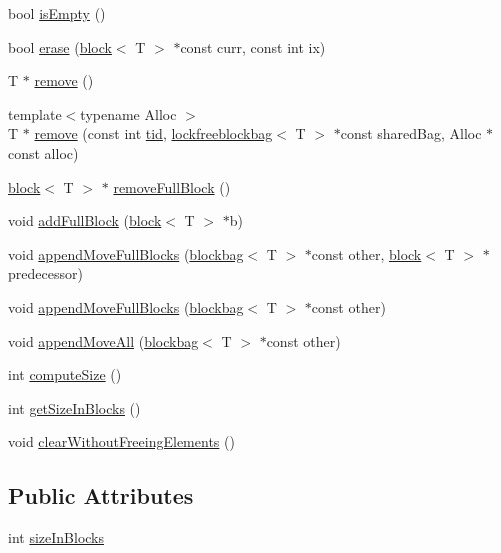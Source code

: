 \begin{DoxyCompactItemize}
bool \hyperlink{classblockbag_a376e7a8a4f8a2a4d0670504b4e8de0ba}{is\+Empty} ()
\item 
bool \hyperlink{classblockbag_ac9ef89b54e16c01853e9ba7fcc3eaad5}{erase} (\hyperlink{classblock}{block}$<$ T $>$ $\ast$const curr, const int ix)
\item 
T $\ast$ \hyperlink{classblockbag_a673f44a045b3b89c1ce9360d20e6037a}{remove} ()
\item 
{\footnotesize template$<$typename Alloc $>$ }\\T $\ast$ \hyperlink{classblockbag_a3d7ed27113ec3ff8239ff7739664dd0b}{remove} (const int \hyperlink{microbench_2main_8cpp_a9ca9869868fe7e7a38a921cc7de4103f}{tid}, \hyperlink{classlockfreeblockbag}{lockfreeblockbag}$<$ T $>$ $\ast$const shared\+Bag, Alloc $\ast$const alloc)
\item 
\hyperlink{classblock}{block}$<$ T $>$ $\ast$ \hyperlink{classblockbag_adba6ec96857fc02a2eceba07568fafae}{remove\+Full\+Block} ()
\item 
void \hyperlink{classblockbag_ab8fa06856490589dd63e2c8058b3db63}{add\+Full\+Block} (\hyperlink{classblock}{block}$<$ T $>$ $\ast$b)
\item 
void \hyperlink{classblockbag_a696366e13be4fe60aefe9a359833aea2}{append\+Move\+Full\+Blocks} (\hyperlink{classblockbag}{blockbag}$<$ T $>$ $\ast$const other, \hyperlink{classblock}{block}$<$ T $>$ $\ast$predecessor)
\item 
void \hyperlink{classblockbag_a0c09852cf71019478f8d8d12579c514a}{append\+Move\+Full\+Blocks} (\hyperlink{classblockbag}{blockbag}$<$ T $>$ $\ast$const other)
\item 
void \hyperlink{classblockbag_ad7964703f189c0cc1417ba6d4d642093}{append\+Move\+All} (\hyperlink{classblockbag}{blockbag}$<$ T $>$ $\ast$const other)
\item 
int \hyperlink{classblockbag_a8211033edefa32a954bd9b2fbe718498}{compute\+Size} ()
\item 
int \hyperlink{classblockbag_ab59a59fd142e5b42d67580662012543d}{get\+Size\+In\+Blocks} ()
\item 
void \hyperlink{classblockbag_a2ed40017536b0d2882c8b5ca432a0ebc}{clear\+Without\+Freeing\+Elements} ()
\end{DoxyCompactItemize}
\subsection*{Public Attributes}
\begin{DoxyCompactItemize}
\item 
int \hyperlink{classblockbag_a6245fc873d3db253783944ce2bbbacce}{size\+In\+Blocks}
\end{DoxyCompactItemize}


